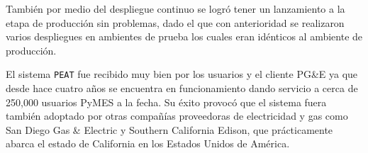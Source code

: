 También por medio del despliegue continuo se logró tener un lanzamiento a la etapa
de producción sin problemas, dado el que con anterioridad se realizaron varios
despliegues en ambientes de prueba los cuales eran idénticos al ambiente de
producción.

\pagebreak

El sistema \texttt{PEAT} fue recibido muy bien por los usuarios y el cliente PG\&E
ya que desde hace cuatro años se encuentra en funcionamiento dando servicio a cerca
de 250,000 usuarios PyMES a la fecha\cite{30_pge_annual_report}. Su éxito provocó que
el sistema fuera también adoptado por otras compañías proveedoras de electricidad y
gas como San Diego Gas \& Electric\cite{32_reuters_c3} y Southern California Edison,
que prácticamente abarca el estado de California en los Estados Unidos de
América\cite{31_energy_map}.
